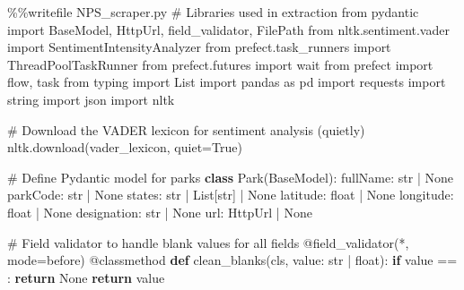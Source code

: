 \documentclass[
  letterpaper,
  DIV=11,
  numbers=noendperiod]{scrartcl}
\newenvironment{Shaded}{\begin{snugshade}}{\end{snugshade}}
\newcommand{\AttributeTok}[1]{\textcolor[rgb]{0.40,0.45,0.13}{#1}}
\newcommand{\BuiltInTok}[1]{\textcolor[rgb]{0.00,0.23,0.31}{#1}}
\newcommand{\CommentTok}[1]{\textcolor[rgb]{0.37,0.37,0.37}{#1}}
\newcommand{\ControlFlowTok}[1]{\textcolor[rgb]{0.00,0.23,0.31}{\textbf{#1}}}
\newcommand{\ImportTok}[1]{\textcolor[rgb]{0.00,0.46,0.62}{#1}}
\newcommand{\KeywordTok}[1]{\textcolor[rgb]{0.00,0.23,0.31}{\textbf{#1}}}
\newcommand{\NormalTok}[1]{\textcolor[rgb]{0.00,0.23,0.31}{#1}}
\newcommand{\OperatorTok}[1]{\textcolor[rgb]{0.37,0.37,0.37}{#1}}
\newcommand{\StringTok}[1]{\textcolor[rgb]{0.13,0.47,0.30}{#1}}
\newcommand{\VariableTok}[1]{\textcolor[rgb]{0.07,0.07,0.07}{#1}}
\begin{document}
\begin{Shaded}
\begin{Highlighting}[]
\OperatorTok{\%\%}\NormalTok{writefile NPS\_scraper.py}
\CommentTok{\# Libraries used in extraction}
\ImportTok{from}\NormalTok{ pydantic }\ImportTok{import}\NormalTok{ BaseModel, HttpUrl, field\_validator, FilePath}
\ImportTok{from}\NormalTok{ nltk.sentiment.vader }\ImportTok{import}\NormalTok{ SentimentIntensityAnalyzer}
\ImportTok{from}\NormalTok{ prefect.task\_runners }\ImportTok{import}\NormalTok{ ThreadPoolTaskRunner}
\ImportTok{from}\NormalTok{ prefect.futures }\ImportTok{import}\NormalTok{ wait}
\ImportTok{from}\NormalTok{ prefect }\ImportTok{import}\NormalTok{ flow, task}
\ImportTok{from}\NormalTok{ typing }\ImportTok{import}\NormalTok{ List}
\ImportTok{import}\NormalTok{ pandas }\ImportTok{as}\NormalTok{ pd}
\ImportTok{import}\NormalTok{ requests}
\ImportTok{import}\NormalTok{ string}
\ImportTok{import}\NormalTok{ json}
\ImportTok{import}\NormalTok{ nltk}

\CommentTok{\# Download the VADER lexicon for sentiment analysis (quietly)}
\NormalTok{nltk.download(}\StringTok{\textquotesingle{}vader\_lexicon\textquotesingle{}}\NormalTok{, quiet}\OperatorTok{=}\VariableTok{True}\NormalTok{)}

\CommentTok{\# Define Pydantic model for parks}
\KeywordTok{class}\NormalTok{ Park(BaseModel):}
\NormalTok{    fullName: }\BuiltInTok{str} \OperatorTok{|} \VariableTok{None}
\NormalTok{    parkCode: }\BuiltInTok{str} \OperatorTok{|} \VariableTok{None}
\NormalTok{    states: }\BuiltInTok{str} \OperatorTok{|}\NormalTok{ List[}\BuiltInTok{str}\NormalTok{] }\OperatorTok{|} \VariableTok{None}
\NormalTok{    latitude: }\BuiltInTok{float} \OperatorTok{|} \VariableTok{None}
\NormalTok{    longitude: }\BuiltInTok{float} \OperatorTok{|} \VariableTok{None}
\NormalTok{    designation: }\BuiltInTok{str} \OperatorTok{|} \VariableTok{None}
\NormalTok{    url: HttpUrl }\OperatorTok{|} \VariableTok{None}

    \CommentTok{\# Field validator to handle blank values for all fields}
    \AttributeTok{@field\_validator}\NormalTok{(}\StringTok{\textquotesingle{}*\textquotesingle{}}\NormalTok{, mode}\OperatorTok{=}\StringTok{\textquotesingle{}before\textquotesingle{}}\NormalTok{)}
    \AttributeTok{@classmethod}
    \KeywordTok{def}\NormalTok{ clean\_blanks(cls, value: }\BuiltInTok{str} \OperatorTok{|} \BuiltInTok{float}\NormalTok{):}
        \ControlFlowTok{if}\NormalTok{ value }\OperatorTok{==} \StringTok{\textquotesingle{}\textquotesingle{}}\NormalTok{:}
            \ControlFlowTok{return} \VariableTok{None}
        \ControlFlowTok{return}\NormalTok{ value}


\end{Highlighting}
\end{Shaded}
\end{document}
